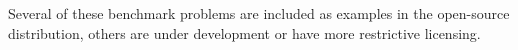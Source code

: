 \documentclass[11pt]{memoir}
\begin{document}
Several of these benchmark problems are included as examples in
the open-source distribution, others are under development or have
more restrictive licensing.

%











\end{document}
